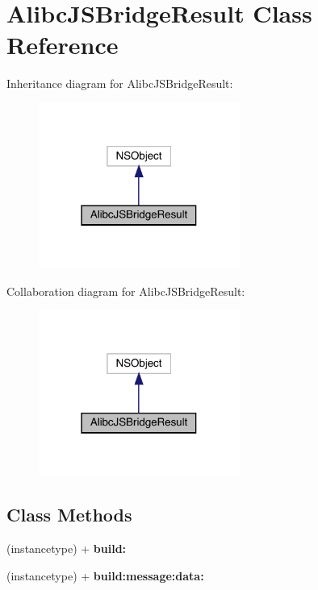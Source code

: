 \hypertarget{interface_alibc_j_s_bridge_result}{}\section{Alibc\+J\+S\+Bridge\+Result Class Reference}
\label{interface_alibc_j_s_bridge_result}


Inheritance diagram for Alibc\+J\+S\+Bridge\+Result\+:\nopagebreak
\begin{figure}[H]
\begin{center}
\leavevmode
\includegraphics[width=187pt]{interface_alibc_j_s_bridge_result__inherit__graph}
\end{center}
\end{figure}


Collaboration diagram for Alibc\+J\+S\+Bridge\+Result\+:\nopagebreak
\begin{figure}[H]
\begin{center}
\leavevmode
\includegraphics[width=187pt]{interface_alibc_j_s_bridge_result__coll__graph}
\end{center}
\end{figure}
\subsection*{Class Methods}
\begin{DoxyCompactItemize}
\item 
\mbox{\label{interface_alibc_j_s_bridge_result_a53c51a51ecf376955e321f5e9553df04}} 
(instancetype) + {\bfseries build\+:}
\item 
\mbox{\label{interface_alibc_j_s_bridge_result_a09d8d1e41e82c81fbe4f0d2721b30c75}} 
(instancetype) + {\bfseries build\+:message\+:data\+:}
\end{DoxyCompactItemize}
